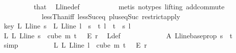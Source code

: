 \begin{isabellebody}
\ \ \ \ \ \ \ \ \isamarkupfalse%
\ that\ \isamarkupfalse%
\ L{\isacharunderscore}{\kern0pt}line{\isacharunderscore}{\kern0pt}def\ \isanewline
\ \ \ \ \ \ \ \ \isamarkupfalse%
\ {\isacharparenleft}{\kern0pt}metis\ {\isacharparenleft}{\kern0pt}no{\isacharunderscore}{\kern0pt}types{\isacharcomma}{\kern0pt}\ lifting{\isacharparenright}{\kern0pt}\ add{\isachardot}{\kern0pt}commute\ \isanewline
\ \ \ \ \ \ \ \ \ \ \ \ lessThan{\isacharunderscore}{\kern0pt}iff\ less{\isacharunderscore}{\kern0pt}Suc{\isacharunderscore}{\kern0pt}eq\ plus{\isacharunderscore}{\kern0pt}{}{\isacharunderscore}{\kern0pt}eq{\isacharunderscore}{\kern0pt}Suc\ restrict{\isacharunderscore}{\kern0pt}apply{\isacharparenright}{\kern0pt}\isanewline
\ \ \ \ \ \ \isamarkupfalse%
\ key{\isacharcolon}{\kern0pt}\ {\isachardoublequoteopen}{\isasymchi}L\ {\isacharparenleft}{\kern0pt}L{\isacharunderscore}{\kern0pt}line\ s{\isacharparenright}{\kern0pt}\ {\isacharequal}{\kern0pt}\ {\isasymchi}L\ {\isacharparenleft}{\kern0pt}L{\isacharunderscore}{\kern0pt}line\ l{\isacharparenright}{\kern0pt}{\isachardoublequoteclose}\ \ {\isachardoublequoteopen}s\ {\isacharless}{\kern0pt}\ t{\isachardoublequoteclose}\ {\isachardoublequoteopen}l\ {\isacharless}{\kern0pt}\ t{\isachardoublequoteclose}\ \ s\ l\isanewline
\ \ \ \ \ \ \isamarkupfalse%
{\isacharminus}{\kern0pt}\isanewline
\ \ \ \ \ \ \ \ \isamarkupfalse%
\ L{}{\isacharcolon}{\kern0pt}\ {\isachardoublequoteopen}{\isasymchi}L\ {\isacharparenleft}{\kern0pt}L{\isacharunderscore}{\kern0pt}line\ s{\isacharparenright}{\kern0pt}\ {\isasymin}\ cube\ m\ {\isacharparenleft}{\kern0pt}t\ {\isacharplus}{\kern0pt}\ {}{\isacharparenright}{\kern0pt}\ {\isasymrightarrow}\isactrlsub E\ {\isacharbraceleft}{\kern0pt}{\isachardot}{\kern0pt}{\isachardot}{\kern0pt}{\isacharless}{\kern0pt}r{\isacharbraceright}{\kern0pt}{\isachardoublequoteclose}\ \isamarkupfalse%
\ {\isasymchi}L{\isacharunderscore}{\kern0pt}def\ \isanewline
\ \ \ \ \ \ \ \ \ \ \isamarkupfalse%
\ A\ L{\isacharunderscore}{\kern0pt}line{\isacharunderscore}{\kern0pt}base{\isacharunderscore}{\kern0pt}prop\ {\isacartoucheopen}s\ {\isacharless}{\kern0pt}\ t{\isacartoucheclose}\ \isamarkupfalse%
\ simp\isanewline
\ \ \ \ \ \ \ \ \isamarkupfalse%
\ L{}{\isacharcolon}{\kern0pt}\ {\isachardoublequoteopen}{\isasymchi}L\ {\isacharparenleft}{\kern0pt}L{\isacharunderscore}{\kern0pt}line\ l{\isacharparenright}{\kern0pt}\ {\isasymin}\ cube\ m\ {\isacharparenleft}{\kern0pt}t\ {\isacharplus}{\kern0pt}\ {}{\isacharparenright}{\kern0pt}\ {\isasymrightarrow}\isactrlsub E\ {\isacharbraceleft}{\kern0pt}{\isachardot}{\kern0pt}{\isachardot}{\kern0pt}{\isacharless}{\kern0pt}r{\isacharbraceright}{\kern0pt}{\isachardoublequoteclose}\ \isamarkupfalse%

\end{isabellebody}

